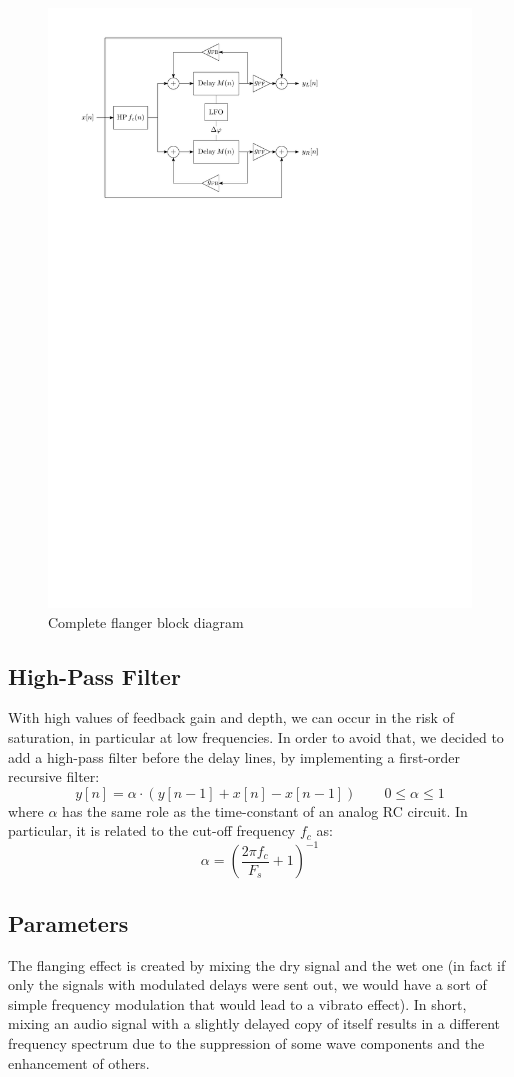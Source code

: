\begin{figure}
	\centering
	\includegraphics[width=0.7\linewidth]{assets/diagram-full.pdf}
	\caption{Complete flanger block diagram}
	\label{fig:diag}
\end{figure}

\subsection{High-Pass Filter}\label{sec:hpf}

With high values of feedback gain and depth, we can occur in the risk of saturation, in particular at low frequencies. In order to avoid that, we decided to add a high-pass filter before the delay lines, by implementing a first-order recursive filter:
\[
y[n] = \alpha \cdot \left( y[n-1] + x[n] - x[n-1] \right)
\qquad
0 \le \alpha \le 1
\]
where $\alpha$ has the same role as the time-constant of an analog RC circuit.
In particular, it is related to the cut-off frequency $f_c$ as:
\[
\alpha = \left( \frac{2 \pi f_c}{F_s} + 1 \right)^{-1}
\]

\subsection{Parameters}\label{sec:parameters}

The flanging effect is created by mixing the dry signal and the wet one (in fact if only the signals with modulated delays were sent out, we would have a sort of simple frequency modulation that would lead to a vibrato effect). In short, mixing an audio signal with a slightly delayed copy of itself results in a different frequency spectrum due to the suppression of some wave components and the enhancement of others.

